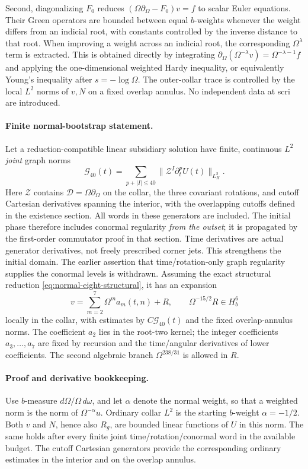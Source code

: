 Second, diagonalizing $F_0$ reduces
$(\Omega\partial_\Omega-F_0)v=f$ to scalar Euler equations.
Their Green operators are bounded between equal $b$-weights whenever the
weight differs from an indicial root, with constants controlled by the
inverse distance to that root. When improving a weight across an indicial
root, the corresponding $\Omega^\lambda$ term is extracted. This is obtained
directly by integrating
$\partial_\Omega(\Omega^{-\lambda}v)=\Omega^{-\lambda-1}f$ and applying the
one-dimensional weighted Hardy inequality, or equivalently Young's inequality
after $s=-\log\Omega$. The outer-collar trace is controlled by the local
$L^2$ norms of $v,N$ on a fixed overlap annulus. No independent data at scri
are introduced.

\paragraph{Finite normal-bootstrap statement.}
Let a reduction-compatible linear subsidiary solution have finite, continuous
$L^2$ \emph{joint} graph norms
\[
 \mathcal G_{40}(t)=
 \sum_{p+|I|\le40}
 \|\mathcal Z^I\partial_t^pU(t)\|_{L^2_H}.
\]
Here $\mathcal Z$ contains $\mathcal D=\Omega\partial_\Omega$ on the collar,
the three covariant rotations, and cutoff Cartesian derivatives spanning
the interior, with the overlapping cutoffs defined in the existence section.
All words in these generators are included.  The initial phase therefore
includes conormal regularity \emph{from the outset}; it is propagated by the
first-order commutator proof in that section.  Time derivatives are actual
generator derivatives, not freely prescribed corner jets.  This strengthens
the initial domain.  The earlier assertion that time/rotation-only graph
regularity supplies the conormal levels is withdrawn.
Assuming the exact structural reduction
\eqref{eq:normal-eight-structural}, it has an expansion
\begin{equation}
 v=\sum_{m=2}^7\Omega^m a_m(t,n)+R,
 \qquad \Omega^{-15/2}R\in H_b^6
 \label{eq:normal-finite-expansion}
\end{equation}
locally in the collar, with estimates by $C\mathcal G_{40}(t)$ and the fixed
overlap-annulus norms. The coefficient $a_2$ lies in the root-two kernel;
the integer coefficients $a_3,\ldots,a_7$ are fixed by recursion and the
time/angular derivatives of lower coefficients. The second algebraic branch
$\Omega^{238/31}$ is allowed in $R$.

\paragraph{Proof and derivative bookkeeping.}
Use $b$-measure $d\Omega/\Omega\,d\omega$, and let $\alpha$ denote the
normal weight, so that a weighted norm is the norm of
$\Omega^{-\alpha}u$. Ordinary collar $L^2$ is the starting $b$-weight
$\alpha=-1/2$. Both $v$ and $N$, hence also $R_g$, are bounded linear
functions of $U$ in this norm. The same holds after every finite joint
time/rotation/conormal word in the available budget.  The cutoff Cartesian
generators provide the corresponding ordinary estimates in the interior
and on the overlap annulus.

